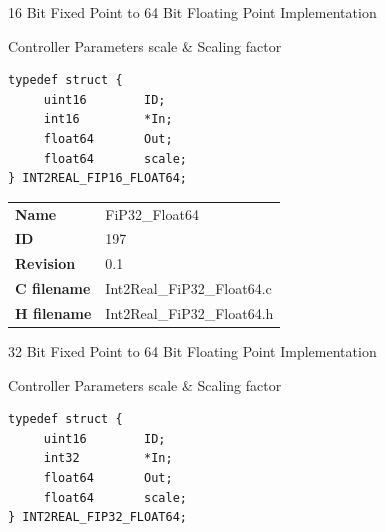 16 Bit Fixed Point to 64 Bit Floating Point Implementation

\begin{XtoCtabular}{Controller Parameters}
scale & Scaling factor\tabularnewline
\hline
\end{XtoCtabular}

\begin{lstlisting}
typedef struct {
     uint16        ID;
     int16         *In;
     float64       Out;
     float64       scale;
} INT2REAL_FIP16_FLOAT64;
\end{lstlisting}

\ifdefined \AddTestReports
{}
\fi
{}
\nopagebreak[0]
\begin{tabular}{l l}
\textbf{Name} & FiP32\_Float64 \tabularnewline
\textbf{ID} & 197 \tabularnewline
\textbf{Revision} & 0.1 \tabularnewline
\textbf{C filename} & Int2Real\_FiP32\_Float64.c \tabularnewline
\textbf{H filename} & Int2Real\_FiP32\_Float64.h \tabularnewline
\end{tabular}
\vspace{1ex}

32 Bit Fixed Point to 64 Bit Floating Point Implementation

\begin{XtoCtabular}{Controller Parameters}
scale & Scaling factor\tabularnewline
\hline
\end{XtoCtabular}

\begin{lstlisting}
typedef struct {
     uint16        ID;
     int32         *In;
     float64       Out;
     float64       scale;
} INT2REAL_FIP32_FLOAT64;
\end{lstlisting}

\ifdefined \AddTestReports
{}
\fi
